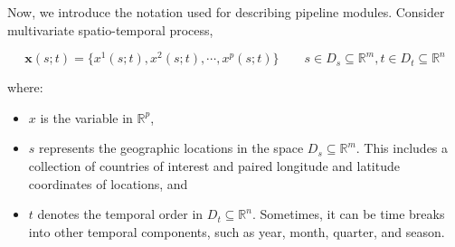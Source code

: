 \documentclass[
]{interact}
\begin{document}
Now, we introduce the notation used for describing pipeline modules.
Consider multivariate spatio-temporal process,

\begin{equation}
\mathbf{x}(s;t) = \{x^1(s;t), x^2(s;t), \cdots, x^p(s;t)\} \qquad s \in D_s \subseteq \mathbb{R}^m, t \in D_t \subseteq \mathbb{R}^n 
\end{equation}

where:

\begin{itemize}
\item
  \(x\) is the variable in \(\mathbb{R}^p\),
\item
  \(s\) represents the geographic locations in the space
  \(D_s \subseteq \mathbb{R}^m\). This includes a collection of
  countries of interest and paired longitude and latitude coordinates of
  locations, and
\item
  \(t\) denotes the temporal order in \(D_t \subseteq \mathbb{R}^n\).
  Sometimes, it can be time breaks into other temporal components, such
  as year, month, quarter, and season.
\end{itemize}
\end{document}
